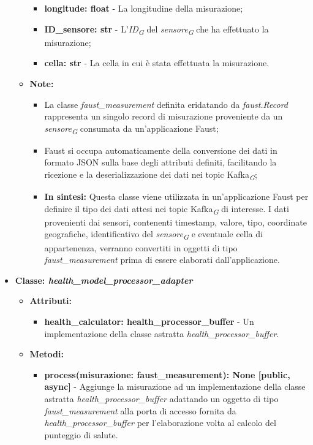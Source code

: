 \begin{itemize}
\begin{itemize}
\begin{itemize}
        \item \textbf{longitude: float} - La longitudine della misurazione;
        \item \textbf{ID\_sensore: str} - L'\textit{ID}\textsubscript{\textit{G}} del \textit{sensore}\textsubscript{\textit{G}} che ha effettuato la misurazione;
        \item \textbf{cella: str} - La cella in cui è stata effettuata la misurazione.
    \end{itemize}
    \item\textbf{Note:}
        \begin{itemize}
            \item La classe \textit{faust\_measurement} definita eridatando da \textit{faust.Record} rappresenta un singolo record di misurazione proveniente da un \textit{sensore}\textsubscript{\textit{G}} consumata da un'applicazione Faust;
            \item Faust si occupa automaticamente della conversione dei dati in formato JSON sulla base degli attributi definiti, facilitando la ricezione e la deserializzazione dei dati nei topic Kafka\textsubscript{\textit{G}};
            \item \textbf{In sintesi:}
            Questa classe viene utilizzata in un'applicazione Faust per definire il tipo dei dati attesi nei topic Kafka\textsubscript{\textit{G}} di interesse. I dati provenienti dai sensori, contenenti timestamp, valore, tipo, coordinate geografiche, identificativo del \textit{sensore}\textsubscript{\textit{G}} e eventuale cella di appartenenza, verranno convertiti in oggetti di tipo \textit{faust\_measurement} prima di essere elaborati dall'applicazione.
        \end{itemize}
    \end{itemize}
    \item{\textbf{Classe: \textit{health\_model\_processor\_adapter}}}
    \begin{itemize}
    \item\textbf{Attributi:}
        \begin{itemize}
        \item \textbf{health\_calculator: health\_processor\_buffer} - Un implementazione della classe astratta \textit{health\_processor\_buffer}.
    \end{itemize}
    \item \textbf{Metodi: }
    \begin{itemize}
        \item \textbf{process(misurazione: faust\_measurement): None [public, async]} - Aggiunge la misurazione ad un implementazione della classe astratta \textit{health\_processor\_buffer} adattando un oggetto di tipo \textit{faust\_measurement} alla porta di accesso fornita da \textit{health\_processor\_buffer} per l'elaborazione volta al calcolo del punteggio di salute.

\end{itemize}
\end{itemize}
\end{itemize}
